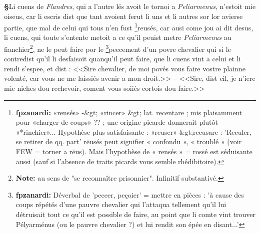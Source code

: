 \documentclass[12pt]{article} %
\newcommand{\colmar}[1]{\marginnote{[#1]}}          %
\newcommand{\persName}[1]{\emph{#1}} %
\newcommand{\placeName}[1]{\emph{#1}} %
\newcommand{\supplied}[1]{\textlangle#1\textrangle} %
\newcommand{\fnnote}[1]{\footnote{\textbf{Note:} #1}} %
\newcommand{\fnfpz}[1]{\footnote{\textbf{fpzanardi:} #1}} %
\newcounter{paranum}
\newcommand{\pnum}{\stepcounter{paranum}\textbf{§\arabic{paranum}}\quad}
\begin{document}
\pnum Li cuens de \placeName{Flandres}, qui a l'autre lés avoit le tornoi a \persName{Peliarmenus}, n'estoit mie oiseus, car li escris dist que tant avoient ferut li uns et li autres sor lor avierse partie, \colmar{6vb}\colmar{b} que mal de celui qui tous n'en fust \fnfpz{«rensés» -&gt; «rincer» &gt; lat. recentare ; mis plaisamment pour «charger de coups» ?? ; une origine picarde donnerait plutôt «*rinchier»... Hypothèse plus satisfaisante : «reuser» &gt;recusare : 'Reculer, se retirer de qq. part' rëusés peut signifier « confondu », « troublé » (voir FEW = torner a rëus). Mais l'hypothèse de « rensés » = rossé est séduisante aussi (sauf si l'absence de traits picards vous semble rhédibitoire).}reusés, car ausi come jou ai dit desus, li cue\supplied{n}s, qui toute s'entente metoit a ce qu'il peuist metre \persName{Peliarmenus} au fianchier\fnnote{au sens de "se reconnaître prisonnier". Infinitif substantivé.}, ne le peut faire por le \fnfpz{Déverbal de 'peceer, peçoier' = mettre en pièces : 'à cause des coups répétés d'une pauvre chevalier qui l'attaqua tellement qu'il lui détruisait tout ce qu'il est possible de faire, au point que li comte vint trouver Pélyarménus (ou le pauvre chevalier ?) et lui rendit son épée en disant...'}peecement d'un povre chevalier qui si le contredist qu'il li desfaisoit quanqu'il peut faire, que li cuens vint a celui et li rendi s'espee, et dist : <<Sire chevalier, de moi povés vous faire vostre plainne volenté, car vous ne me laissiés avenir a mon droit.>> -- <<Sire, dist cil, je n'iere mie niches dou rechevoir, coment vous soiiés cortois dou faire.>>
\end{document}
